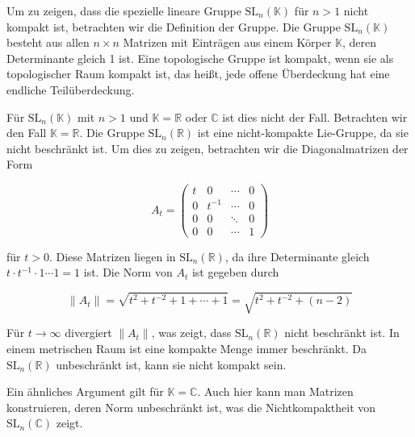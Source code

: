 Um zu zeigen, dass die spezielle lineare Gruppe $\mathrm{SL}_n(\mathbb{K})$ für $n > 1$ nicht kompakt ist, betrachten wir die Definition der Gruppe. Die Gruppe $\mathrm{SL}_n(\mathbb{K})$ besteht aus allen $n \times n$ Matrizen mit Einträgen aus einem Körper $\mathbb{K}$, deren Determinante gleich 1 ist. Eine topologische Gruppe ist kompakt, wenn sie als topologischer Raum kompakt ist, das heißt, jede offene Überdeckung hat eine endliche Teilüberdeckung. 

Für $\mathrm{SL}_n(\mathbb{K})$ mit $n > 1$ und $\mathbb{K} = \mathbb{R}$ oder $\mathbb{C}$ ist dies nicht der Fall. Betrachten wir den Fall $\mathbb{K} = \mathbb{R}$. Die Gruppe $\mathrm{SL}_n(\mathbb{R})$ ist eine nicht-kompakte Lie-Gruppe, da sie nicht beschränkt ist. Um dies zu zeigen, betrachten wir die Diagonalmatrizen der Form

\[
A_t = \begin{pmatrix}
t & 0 & \cdots & 0 \\
0 & t^{-1} & \cdots & 0 \\
0 & 0 & \ddots & 0 \\
0 & 0 & \cdots & 1
\end{pmatrix}
\]

für $t > 0$. Diese Matrizen liegen in $\mathrm{SL}_n(\mathbb{R})$, da ihre Determinante gleich $t \cdot t^{-1} \cdot 1 \cdots 1 = 1$ ist. Die Norm von $A_t$ ist gegeben durch

\[
\|A_t\| = \sqrt{t^2 + t^{-2} + 1 + \cdots + 1} = \sqrt{t^2 + t^{-2} + (n-2)}
\]

Für $t \to \infty$ divergiert $\|A_t\|$, was zeigt, dass $\mathrm{SL}_n(\mathbb{R})$ nicht beschränkt ist. In einem metrischen Raum ist eine kompakte Menge immer beschränkt. Da $\mathrm{SL}_n(\mathbb{R})$ unbeschränkt ist, kann sie nicht kompakt sein.

Ein ähnliches Argument gilt für $\mathbb{K} = \mathbb{C}$. Auch hier kann man Matrizen konstruieren, deren Norm unbeschränkt ist, was die Nichtkompaktheit von $\mathrm{SL}_n(\mathbb{C})$ zeigt.

